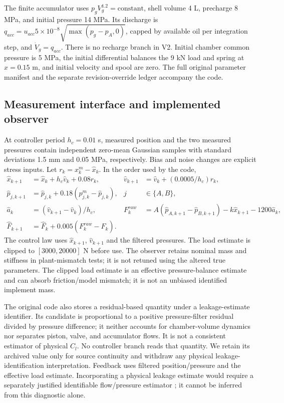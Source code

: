 \documentclass[machines,article,submit,pdftex,moreauthors]{Definitions/mdpi}
\begin{document}
The finite accumulator uses $p_gV_g^{1.2}=\mathrm{constant}$, shell volume 4 L, precharge 8 MPa, and initial pressure 14 MPa. Its discharge is $q_{acc}=u_{acc}5\times10^{-8}\sqrt{\max(p_g-p_A,0)}$, capped by available oil per integration step, and $\dot V_g=q_{acc}$. There is no recharge branch in V2. Initial chamber common pressure is 5 MPa, the initial differential balances the 9 kN load and spring at $x=0.15$ m, and initial velocity and spool are zero. The full original parameter manifest and the separate revision-override ledger accompany the code.

\subsection{Measurement interface and implemented observer}
At controller period $h_c=0.01$ s, measured position and the two measured pressures contain independent zero-mean Gaussian samples with standard deviations 1.5 mm and 0.05 MPa, respectively. Bias and noise changes are explicit stress inputs. Let $r_k=x^m_k-\hat x_k$. In the order used by the code,
\begin{align}
\hat x_{k+1}&=\hat x_k+h_c\hat v_k+0.08r_k,&
\hat v_{k+1}&=\hat v_k+(0.0005/h_c)r_k,\\
\hat p_{j,k+1}&=\hat p_{j,k}+0.18(p^m_{j,k}-\hat p_{j,k}),&j&\in\{A,B\},\\
\hat a_k&=(\hat v_{k+1}-\hat v_k)/h_c,&
F_k^{raw}&=A(\hat p_{A,k+1}-\hat p_{B,k+1})-k\hat x_{k+1}-1200\hat a_k,\\
\hat F_{k+1}&=\hat F_k+0.005(F_k^{raw}-\hat F_k).
\label{eq:observer}
\end{align}
The control law uses $\hat x_{k+1}$, $\hat v_{k+1}$ and the filtered pressures. The load estimate is clipped to $[3000,20000]$ N before use. The observer retains nominal mass and stiffness in plant-mismatch tests; it is not retuned using the altered true parameters. The clipped load estimate is an effective pressure-balance estimate and can absorb friction/model mismatch; it is not an unbiased identified implement mass.

The original code also stores a residual-based quantity under a leakage-estimate identifier. Its candidate is proportional to a positive pressure-filter residual divided by pressure difference; it neither accounts for chamber-volume dynamics nor separates piston, valve, and accumulator flows. It is not a consistent estimator of physical $C_l$. No controller branch reads that quantity. We retain its archived value only for source continuity and withdraw any physical leakage-identification interpretation. Feedback uses filtered position/pressure and the effective load estimate. Incorporating a physical leakage estimate would require a separately justified identifiable flow/pressure estimator \cite{an2005}; it cannot be inferred from this diagnostic alone.
\end{document}
